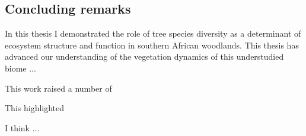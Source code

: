\begin{refsection}
\section{Concluding remarks}

In this thesis I demonstrated the role of tree species diversity as a determinant of ecosystem structure and function in southern African woodlands. This thesis has advanced our understanding of the vegetation dynamics of this understudied biome ...

This work raised a number of 

This highlighted

I think ...

\newpage{}
\begingroup
{}
\printbibliography[heading=subbibintoc]
\endgroup

\end{refsection}

